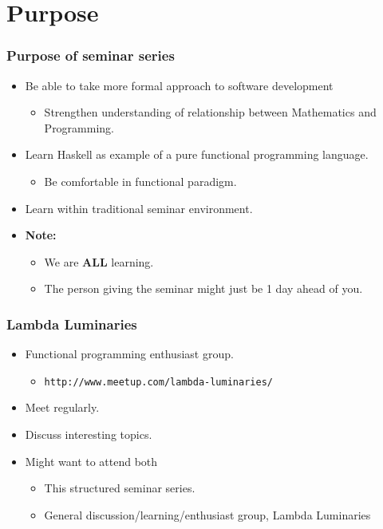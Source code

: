 \section{Purpose}

\begin{frame}
  \frametitle{Purpose of seminar series}
  \begin{itemize}
    \item Be able to take more formal approach to software development
      \begin{itemize}
        \item Strengthen understanding of relationship between Mathematics and Programming.
      \end{itemize}
    \item Learn Haskell as example of a pure functional programming language.
      \begin{itemize}
        \item Be comfortable in functional paradigm.
      \end{itemize}     
    \item Learn within traditional seminar environment.  
    \item {\bf Note:}
      \begin{itemize}
        \item We are {\bf ALL} learning.
        \item The person giving the seminar might just be 1 day ahead of you.
      \end{itemize}
  \end{itemize}
\end{frame}

\begin{frame}
  \frametitle{Lambda Luminaries}
  \begin{itemize}
    \item Functional programming enthusiast group.
      \begin{itemize}
        \item \texttt{http://www.meetup.com/lambda-luminaries/}
      \end{itemize}
    \item Meet regularly.
    \item Discuss interesting topics.
    \item Might want to attend both
      \begin{itemize}
        \item This structured seminar series.
        \item General discussion/learning/enthusiast group, Lambda Luminaries
      \end{itemize}
  \end{itemize}
\end{frame}